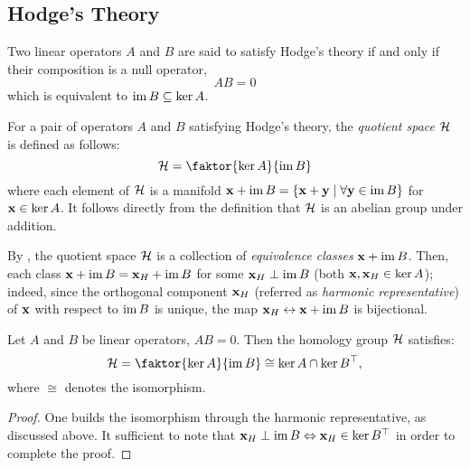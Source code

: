 \subsection{ Hodge's Theory }

Two linear operators \( A \) and \( B \) are said to satisfy Hodge's theory if and only if their composition is a null operator, 
\begin{equation}
      A B = 0
\end{equation}
which is equivalent to \( \operatorname{im} B \subseteq \ker A \).

\begin{definition}\label{def:quotient}
      For a pair of operators \( A \) and \( B \) satisfying Hodge's theory, the \emph{quotient space} \( \mathcal{H} \) is defined as follows:
      \begin{equation}
            \mc H = \faktor{ \ker A }{\im B}
      \end{equation}
      where each element of \( \mathcal{H} \) is a manifold \( \mathbf{x} + \operatorname{im} B = \left\{ \mathbf{x} + \mathbf{y} \mid \forall \mathbf{y} \in \operatorname{im} B \right\}\) for \( \mathbf{x} \in \ker A \). It follows directly from the definition that \( \mathcal{H}\) is an abelian group under addition.
\end{definition}

By , the quotient space \( \mathcal{H} \) is a collection of \emph{equivalence classes} \( \mathbf{x} + \operatorname{im} B \). Then, each class \( \mathbf{x} + \operatorname{im} B = \mathbf{x}_H + \operatorname{im} B \) for some \( \mathbf{x}_H \perp \operatorname{im} B \) (both \( \mathbf{x}, \mathbf{x}_H \in \ker A \)); indeed, since the orthogonal component \( \mathbf{x}_H \) (referred as \emph{harmonic representative}) of \( \mathbf{x} \) with respect to \( \operatorname{im} B\) is unique, the map \( \mathbf{x}_H \leftrightarrow \mathbf{x} + \operatorname{im} B \) is bijectional.

\begin{theorem}\label{thm:two_kernels}
      Let \( A \) and \( B \) be linear operators, \( A B = 0 \). Then the homology group \( \mathcal{H} \) satisfies:
      \begin{equation}
            \mc H = \faktor{\ker A }{\im B } \cong \ker A \cap \ker B^\top,
      \end{equation}
      where \( \cong \) denotes the isomorphism.
\end{theorem}

\begin{proof}
      One builds the isomorphism through the harmonic representative, as discussed above. It sufficient to note that \( \mathbf{x}_H \perp \operatorname{im} B \Leftrightarrow \mathbf{x}_H \in \ker B^\top \) in order to complete the proof.
\end{proof}

